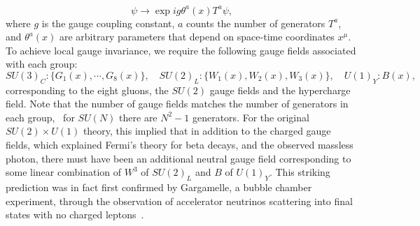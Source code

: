 \begin{equation}
\psi  \to \exp{i g \theta^a(x) T^a } \psi,
\end{equation}
where $g$ is the gauge coupling constant, $a$ counts the number of generators $T^a$, and $\theta^a(x)$ are arbitrary parameters that depend on space-time coordinates $x^\mu$. To achieve local gauge invariance, we require the following gauge fields associated with each group:
%
\begin{equation}
 SU(3)_C: \{G_1 (x), \cdots, G_8 (x)\}, \quad SU(2)_L:  \{W_1(x), W_2(x), W_3(x)\}, \quad U(1)_Y: B(x),
\end{equation}
%
corresponding to the eight gluons, the $SU(2)$ gauge fields and the hypercharge field. Note that the number of gauge fields matches the number of generators in each group, \eg\ for $SU(N)$ there are $N^2 -1$ generators. For the original $SU(2)\times U(1)$ theory, this implied that in addition to the charged gauge fields, which explained Fermi's theory for beta decays, and the observed massless photon, there must have been an additional neutral gauge field corresponding to some linear combination of $W^3$ of $SU(2)_L$ and $B$ of $U(1)_Y$. This striking prediction was in fact first confirmed by Gargamelle, a bubble chamber experiment, through the observation of accelerator neutrinos scattering into final states with no charged leptons~\cite{Hasert:1973ff}. 

